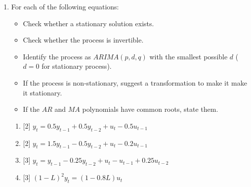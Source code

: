 \documentclass[12pt]{article}
\begin{document}
\begin{enumerate}
\item For each of the following equations:
\begin{itemize}
    \item Check whether a stationary solution exists.
    \item Check whether the process is invertible.
    \item Identify the process as $ARIMA(p,d,q)$ with the smallest possible $d$ ($d=0$ for stationary process).
    \item If the process is non-stationary, suggest a transformation to make it make it stationary.
    \item If the $AR$ and $MA$ polynomials have common roots, state them.
\end{itemize}

\begin{enumerate}
    \item {[2]} \(y_t = 0.5 y_{t-1} + 0.5 y_{t-2} + u_t - 0.5 u_{t-1}\)
    \item {[2]} \(y_t = 1.5 y_{t-1} - 0.5 y_{t-2} + u_t - 0.2 u_{t-1}\)
    \item {[3]} \(y_t = y_{t-1} - 0.25 y_{t-2} + u_t - u_{t-1} + 0.25 u_{t-2}\)
    \item {[3]} \((1 - L)^2 y_t = (1 - 0.8L) u_t\)
\end{enumerate}


\end{enumerate}
\end{document}
